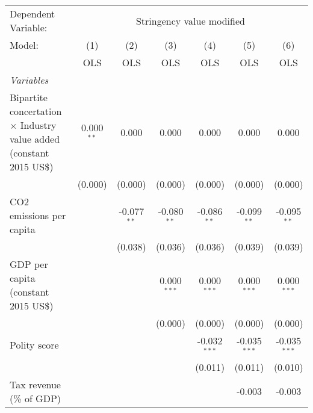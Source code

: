 
\begingroup
\centering
\begin{tabular}{lcccccc}
   \toprule
   Dependent Variable: & \multicolumn{6}{c}{Stringency value modified}\\
   Model:                                                                      & (1)          & (2)           & (3)           & (4)            & (5)            & (6)\\  
                                                                               &  OLS         & OLS           & OLS           & OLS            & OLS            & OLS\\  
   \midrule
   \emph{Variables}\\
   Bipartite concertation $\times$ Industry value added (constant 2015 US\$)   & 0.000$^{**}$ & 0.000         & 0.000         & 0.000          & 0.000          & 0.000\\   
                                                                               & (0.000)      & (0.000)       & (0.000)       & (0.000)        & (0.000)        & (0.000)\\   
   CO2 emissions per capita                                                    &              & -0.077$^{**}$ & -0.080$^{**}$ & -0.086$^{**}$  & -0.099$^{**}$  & -0.095$^{**}$\\   
                                                                               &              & (0.038)       & (0.036)       & (0.036)        & (0.039)        & (0.039)\\   
   GDP per capita (constant 2015 US\$)                                         &              &               & 0.000$^{***}$ & 0.000$^{***}$  & 0.000$^{***}$  & 0.000$^{***}$\\   
                                                                               &              &               & (0.000)       & (0.000)        & (0.000)        & (0.000)\\   
   Polity score                                                                &              &               &               & -0.032$^{***}$ & -0.035$^{***}$ & -0.035$^{***}$\\   
                                                                               &              &               &               & (0.011)        & (0.011)        & (0.010)\\   
   Tax revenue (\% of GDP)                                                     &              &               &               &                & -0.003         & -0.003\\   

\end{tabular}
